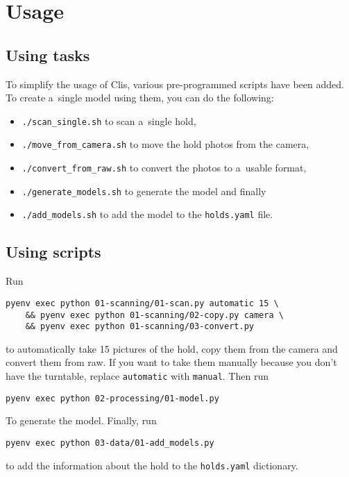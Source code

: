 \section{Usage}

\subsection{Using tasks}

To simplify the usage of Clis, various pre-programmed scripts have been added.
To create a~single model using them, you can do the following:

\begin{itemize}
	\item \texttt{./scan_single.sh} to scan a~single hold,
	\item \texttt{./move_from_camera.sh} to move the hold photos from the camera,
	\item \texttt{./convert_from_raw.sh} to convert the photos to a~usable format,
	\item \texttt{./generate_models.sh} to generate the model and finally
	\item \texttt{./add_models.sh} to add the model to the \texttt{holds.yaml} file.
\end{itemize}

\subsection{Using scripts}

Run

\begin{verbatim}
pyenv exec python 01-scanning/01-scan.py automatic 15 \
	&& pyenv exec python 01-scanning/02-copy.py camera \
	&& pyenv exec python 01-scanning/03-convert.py
\end{verbatim}

to automatically take 15 pictures of the hold, copy them from the camera
and convert them from raw. If you want to take them manually because you
don't have the turntable, replace \texttt{automatic} with
\texttt{manual}. Then run

\begin{verbatim}
pyenv exec python 02-processing/01-model.py
\end{verbatim}

To generate the model. Finally, run

\begin{verbatim}
pyenv exec python 03-data/01-add_models.py
\end{verbatim}

to add the information about the hold to the \texttt{holds.yaml}
dictionary.
